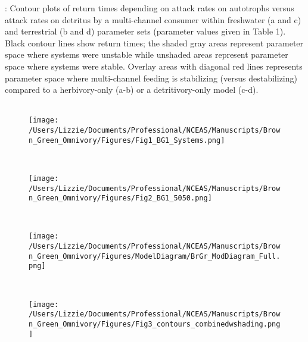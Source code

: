 \documentclass[12pt,a4paper,oneside]{article}
\begin{document}
: Contour plots of return times
 depending on attack rates on autotrophs 
versus attack rates on detritus by a multi-channel consumer within freshwater (a and c)
and terrestrial (b and d) parameter sets (parameter values given in Table 1). 
Black contour lines show return times; the shaded gray areas represent parameter space where systems were unstable while unshaded areas represent parameter space where systems were
stable. Overlay areas with diagonal red lines represents parameter space where
multi-channel feeding is stabilizing (versus destabilizing) compared to a herbivory-only (a-b) or a detritivory-only model (c-d).\\

\newpage
{}
\\
\begin{figure}[h!]
\centering
\noindent \texttt{[image: /Users/Lizzie/Documents/Professional/NCEAS/Manuscripts/Brown\_Green\_Omnivory/Figures/Fig1\_BG1\_Systems.png]}
\end{figure}

\newpage
{}
\\
\begin{figure}[h!]
\centering
\noindent \texttt{[image: /Users/Lizzie/Documents/Professional/NCEAS/Manuscripts/Brown\_Green\_Omnivory/Figures/Fig2\_BG1\_5050.png]}
\end{figure}

\newpage
{}
\\
\begin{figure}[h!]
\centering
\noindent \texttt{[image: /Users/Lizzie/Documents/Professional/NCEAS/Manuscripts/Brown\_Green\_Omnivory/Figures/ModelDiagram/BrGr\_ModDiagram\_Full.png]}
\end{figure}

\newpage
{}
\\
\begin{figure}[h!]
\centering
\noindent \texttt{[image: /Users/Lizzie/Documents/Professional/NCEAS/Manuscripts/Brown\_Green\_Omnivory/Figures/Fig3\_contours\_combinedwshading.png]}
\end{figure}
\end{document}
